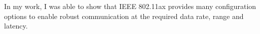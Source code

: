 In my work, I was able to show that IEEE 802.11ax provides many configuration options to enable robust communication at the required data rate, range and latency.







\begin{comment}
    Untersuchen, welche Routing protocols
    Wi-Fi offers a wide range of physical layer configurations, which can be used to reduce the data rate and enable robust communication.

    Future work could investigate whether modern Wi-Fi can be used for other \ac{WIC} use cases.
    IEEE 802.11bd is a new standard, which is designed for \ac{WIC} in the industrial domain.
\end{comment}